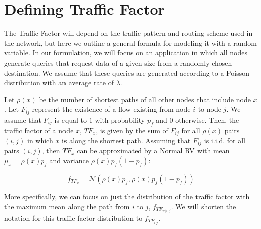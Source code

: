 \section{Defining Traffic Factor}
\label{sec:def_tf}

The Traffic Factor will depend on the traffic pattern and routing scheme used in the network, but here we outline a general formula for modeling it with a random variable.  In our formulation, we will focus on an application in which all nodes generate queries that request data of a given size from a randomly chosen destination.  We assume that these queries are generated according to a Poisson distribution with an average rate of $\lambda$.  

Let $\rho(x)$ be the number of shortest paths of all other nodes that include node $x$.  Let $F_{ij}$ represent the existence of a flow existing from node $i$ to node $j$.  We assume that $F_{ij}$ is equal to $1$ with probability $p_f$ and $0$ otherwise.  Then, the traffic factor of a node $x$, $TF_x$, is given by the sum of $F_{ij}$ for all $\rho(x)$ pairs $(i,j)$ in which $x$ is along the shortest path.  Assuming that $F_{ij}$ is i.i.d. for all pairs $(i,j)$, then $TF_x$ can be approximated by a Normal RV with mean $\mu_x = \rho(x) p_f$ and variance $\rho(x) p_f (1-p_f)$:

\begin{equation}
	f_{TF_x} = \mathcal{N}(\rho(x) p_f, \rho(x) p_f (1-p_f)) 
\end{equation}



More specifically, we can focus on just the distribution of the traffic factor with the maximum mean along the path from $i$ to $j$, $f_{TF_{x' | i,j}}$.  We will shorten the notation for this traffic factor distribution to $f_{TF_{i | j}}$.  %

